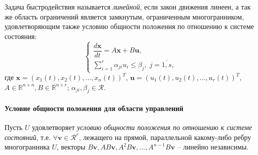 
\begin{definition}
  Задача быстродействия называется \emph{линейной}, если закон движения линеен, а так же область ограничений является замкнутым, ограниченным многогранником, удовлетворяющим также условию общности положения по отношению к системе состояния:
  \[
    \begin{cases}
      \dfrac{d\mathbf{x}}{dt} = A\mathbf{x} + B\mathbf{u}, \\
      \sum_{i=1}^r \alpha_{ji} u_i \leqslant \beta_j, \; j=\overline{1, s},
    \end{cases}
  \]
  где $\mathbf{x} = \left( x_1(t), x_2(t), \dots, x_n(t) \right)^T$,
  $\mathbf{u} = \left( u_1(t), u_2(t), \dots, u_r(t) \right)^T$,
  $A \in \mathbb{R}^{n\times n}, B \in \mathbb{R}^{n\times r}$;
  $\alpha_{ji}, \beta_j \in \mathcal{R}$. 
\end{definition}


\paragraph{Условие общности положения для области управлений}
Пусть $U$ удовлетворяет \emph{условию общности положения по отношению к системе состояний}, т.е. 
$\forall \mathbf{v}\in\mathcal{R}^r$, лежащего на прямой, параллельной какому-либо ребру
многогранника $U$, векторы
$B\mathbf{v}, AB\mathbf{v}, A^2B\mathbf{v}, \dots, A^{n-1}B\mathbf{v}$ -- линейно независимы.

